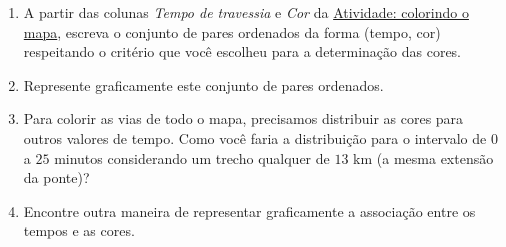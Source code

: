\documentclass[10 pt,usenames,dvipsnames, oneside]{article}
\begin{document}
\begin{enumerate}
\item {} 
A partir das colunas \emph{Tempo de travessia} e \emph{Cor} da {\hyperref[\detokenize{AF106-2:ativ-funcoes-colorindo-o-mapa}]{Atividade: colorindo o mapa}}, escreva o conjunto de pares ordenados da forma (tempo, cor) respeitando o critério que você escolheu para a determinação das cores.

\item {} 
Represente graficamente este conjunto de pares ordenados.

\item {} 
Para colorir as vias de todo o mapa, precisamos distribuir as cores para outros valores de tempo. Como você faria a distribuição para o intervalo de \(0\) a \(25\) minutos considerando um trecho qualquer de \(13\) km (a mesma extensão da ponte)?

\item {} 
Encontre outra maneira de representar graficamente a associação entre os tempos e as cores.

\end{enumerate}
\end{document}

